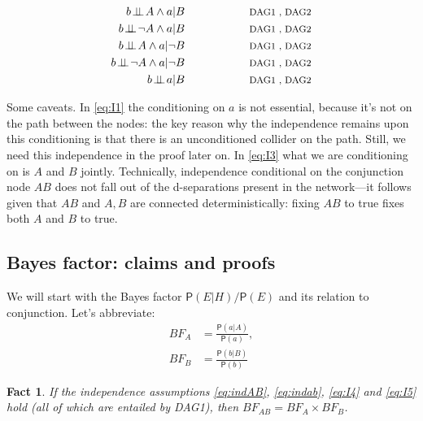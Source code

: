 \documentclass[
  10pt,
  dvipsnames,enabledeprecatedfontcommands]{scrartcl}
\newcommand{\indep}{\!\perp \!\!\! \perp\!}
\newtheorem{fact}{Fact}
\newcommand{\n}{\neg}
\newcommand{\et}{\wedge}
\newcommand{\pr}[1]{\ensuremath{\mathsf{P}(#1)}}
\begin{document}
\begin{figure}
\begin{subfigure}[!ht]{0.5\textwidth}
\begin{align}
b\indep A \et a \vert B \label{eq:I5}  & \hspace{2cm}\mbox{\footnotesize DAG1 , DAG2} \\
b\indep \n A \et a \vert B \label{eq:I5a} &\hspace{2cm}\mbox{\footnotesize DAG1 , DAG2}  \\
b\indep A \et a \vert \n B \label{eq:I5b} & \hspace{2cm}\mbox{\footnotesize DAG1 , DAG2} \\
b\indep \n A \et a \vert \n B \label{eq:I5c} & \hspace{2cm}\mbox{\footnotesize DAG1 , DAG2} \\
b \indep a \vert B \label{eq:I6} & \hspace{2cm}\mbox{\footnotesize DAG1 , DAG2} 
\end{align}
\end{subfigure}
\end{figure}

Some caveats. In \eqref{eq:I1} the conditioning on \(a\) is not
essential, because it's not on the path between the nodes: the key
reason why the independence remains upon this conditioning is that there
is an unconditioned collider on the path. Still, we need this
independence in the proof later on. In \eqref{eq:I3} what we are
conditioning on is \(A\) and \(B\) jointly. Technically, independence
conditional on the conjunction node \(AB\) does not fall out of the
d-separations present in the network---it follows given that \(AB\) and
\(A,B\) are connected deterministically: fixing \(AB\) to true fixes
both \(A\) and \(B\) to true.

\hypertarget{bayes-factor-claims-and-proofs}{%
\subsection*{Bayes factor: claims and
proofs}\label{bayes-factor-claims-and-proofs}}

We will start with the Bayes factor \(\pr{E \vert H}/\pr{E}\) and its
relation to conjunction. Let's abbreviate: \begin{align*}
BF_A  & =  \frac{\pr{a \vert A}}{\pr{a}},\\
BF_B & = \frac{\pr{b \vert B}}{\pr{b}}
\end{align*}

\begin{fact} If the independence assumptions \eqref{eq:indAB}, \eqref{eq:indab}, \eqref{eq:I4} and \eqref{eq:I5} hold (all of which are entailed by \textsf{DAG1}), then 
$BF_{AB} = BF_A \times BF_B$. \label{fac:BFindep}
\end{fact}
\end{document}

